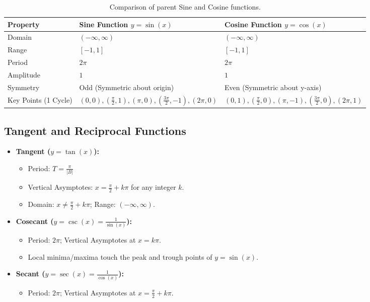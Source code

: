 \documentclass[11pt, a4paper]{article}
\begin{document}
\begin{table}[h]
\centering
\begin{tabular}{l p{5cm} p{5cm}}
\toprule
\textbf{Property} & \textbf{Sine Function } $y = \sin(x)$ & \textbf{Cosine Function } $y = \cos(x)$ \\
\midrule
Domain & $(-\infty, \infty)$ & $(-\infty, \infty)$ \\
Range & $[-1, 1]$ & $[-1, 1]$ \\
Period & $2\pi$ & $2\pi$ \\
Amplitude & $1$ & $1$ \\
Symmetry & Odd (Symmetric about origin) & Even (Symmetric about y-axis) \\
Key Points (1 Cycle) & $(0,0), (\frac{\pi}{2},1), (\pi,0), (\frac{3\pi}{2},-1), (2\pi,0)$ & $(0,1), (\frac{\pi}{2},0), (\pi,-1), (\frac{3\pi}{2},0), (2\pi,1)$ \\
\bottomrule
\end{tabular}
\caption{Comparison of parent Sine and Cosine functions.}
\end{table}

\subsection{Tangent and Reciprocal Functions}

\begin{itemize}
    \item \textbf{Tangent ($y = \tan(x)$):} 
    \begin{itemize}
        \item Period: $T = \frac{\pi}{|B|}$
        \item Vertical Asymptotes: $x = \frac{\pi}{2} + k\pi$ for any integer $k$.
        \item Domain: $x \neq \frac{\pi}{2} + k\pi$; Range: $(-\infty, \infty)$.
    \end{itemize}
    \item \textbf{Cosecant ($y = \csc(x) = \frac{1}{\sin(x)}$):}
    \begin{itemize}
        \item Period: $2\pi$; Vertical Asymptotes at $x = k\pi$.
        \item Local minima/maxima touch the peak and trough points of $y = \sin(x)$.
    \end{itemize}
    \item \textbf{Secant ($y = \sec(x) = \frac{1}{\cos(x)}$):}
    \begin{itemize}
        \item Period: $2\pi$; Vertical Asymptotes at $x = \frac{\pi}{2} + k\pi$.
    \end{itemize}
\end{itemize}
\end{document}
